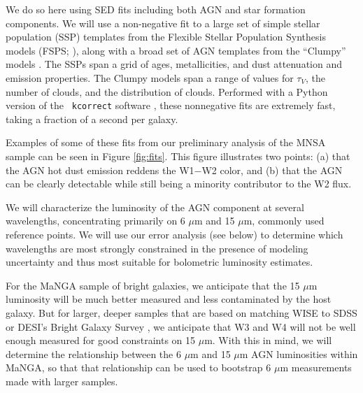 \documentclass[12pt, preprint]{hacked-aastex}
\begin{document}

We do so here using SED fits including both AGN and star formation
components. We will use a non-negative fit to a large set of simple
stellar population (SSP) templates from the Flexible Stellar
Population Synthesis models (FSPS; \cite{conroy09a}), along with a
broad set of AGN templates from the ``Clumpy'' models
\cite{nenkova08a}. The SSPs span a grid of ages, metallicities, and
dust attenuation and emission properties. The Clumpy models span a
range of values for $\tau_V$, the number of clouds, and the
distribution of clouds. Performed with a Python version of the {\tt
  kcorrect} software \cite{blanton07b}, these nonnegative fits are
extremely fast, taking a fraction of a second per galaxy.

Examples of some of these fits from our preliminary analysis of the
MNSA sample can be seen in Figure \ref{fig:fits}. This figure
illustrates two points: (a) that the AGN hot dust emission reddens the
W1$-$W2 color, and (b) that the AGN can be clearly detectable while
still being a minority contributor to the W2 flux.

We will characterize the luminosity of the AGN component at several
wavelengths, concentrating primarily on 6 $\mu$m and 15 $\mu$m,
commonly used reference points. We will use our error analysis (see
below) to determine which wavelengths are most strongly constrained in
the presence of modeling uncertainty and thus most suitable for
bolometric luminosity estimates.

For the MaNGA sample of bright galaxies, we anticipate that the 15
$\mu$m luminosity will be much better measured and less contaminated
by the host galaxy.  But for larger, deeper samples that are based on
matching WISE to SDSS or DESI's Bright Galaxy Survey \cite{assef18a,
  hviding22a}, we anticipate that W3 and W4 will not be well enough
measured for good constraints on 15 $\mu$m.  With this in mind, we
will determine the relationship between the 6 $\mu$m and 15 $\mu$m AGN
luminosities within MaNGA, so that that relationship can be used to
bootstrap 6 $\mu$m measurements made with larger samples.
\end{document}
